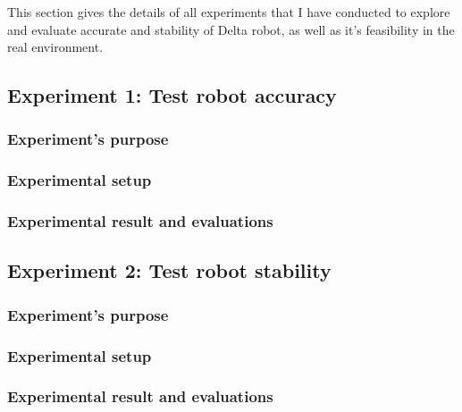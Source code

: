 This section gives the details of all experiments that I have conducted to explore and evaluate accurate and stability of Delta robot, as well as it's feasibility in the real environment.

\subsection{Experiment 1: Test robot accuracy}
\subsubsection{Experiment's purpose}

\subsubsection{Experimental setup}

\subsubsection{Experimental result and evaluations}

\subsection{Experiment 2: Test robot stability}
\subsubsection{Experiment's purpose}

\subsubsection{Experimental setup}

\subsubsection{Experimental result and evaluations}


